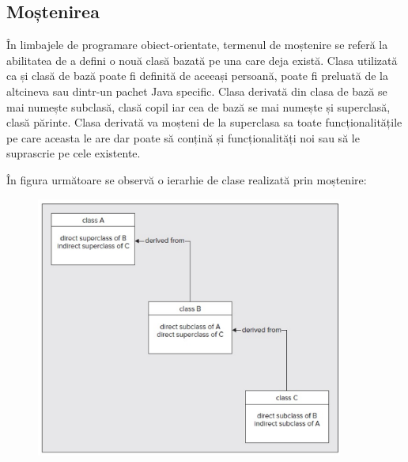 \subsection{Moștenirea}
În limbajele de programare obiect-orientate, termenul de moștenire se referă la abilitatea de a defini o nouă clasă bazată pe una care deja există.
Clasa utilizată ca și clasă de bază poate fi definită de aceeași persoană, poate fi preluată de la altcineva sau dintr-un pachet Java specific.
Clasa derivată din clasa de bază se mai numește subclasă, clasă copil iar cea de bază se mai numește și superclasă, clasă părinte. 
Clasa derivată va moșteni de la superclasa sa toate funcționalitățile pe care aceasta le are dar poate să conțină și funcționalități noi sau să le suprascrie pe cele existente.\cite{14}

În figura următoare se observă o ierarhie de clase realizată prin moștenire:
\begin{figure}[!hp]
\centering
\includegraphics[width=0.9\textwidth]
{imagini/mostenire1.eps}
\end{figure}


